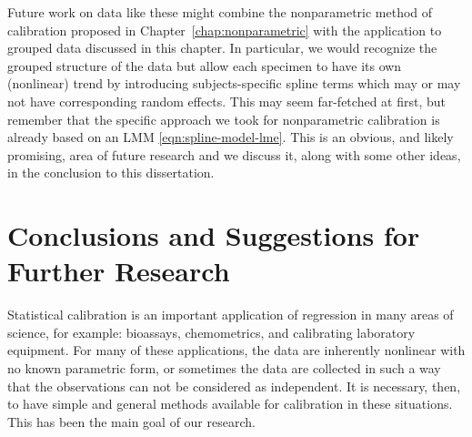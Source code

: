 \documentclass[cmfont,usenames,dvipsnames,leqno]{afit-etd}\usepackage[]{graphicx}\usepackage[]{color}
\begin{document}
% 


Future work on data like these might combine the nonparametric method of calibration proposed in Chapter~\ref{chap:nonparametric} with the application to grouped data discussed in this chapter. In particular, we would recognize the grouped structure of the data but allow each specimen to have its own (nonlinear) trend by introducing subjects-specific spline terms which may or may not have corresponding random effects. This may seem far-fetched at first, but remember that the specific approach we took for nonparametric calibration is already based on an LMM \eqref{eqn:spline-model-lme}. This is an obvious, and likely promising, area of future research and we discuss it, along with some other ideas, in the conclusion to this dissertation.





\chapter{Conclusions and Suggestions for Further Research}
\label{chp:conclusion}
Statistical calibration is an important application of regression in many areas of science, for example: bioassays, chemometrics, and calibrating laboratory equipment. For many of these applications, the data are inherently nonlinear with no known parametric form, or sometimes the data are collected in such a way that the observations can not be considered as independent. It is necessary, then, to have simple and general methods available for calibration in these situations. This has been the main goal of our research.
\end{document}
